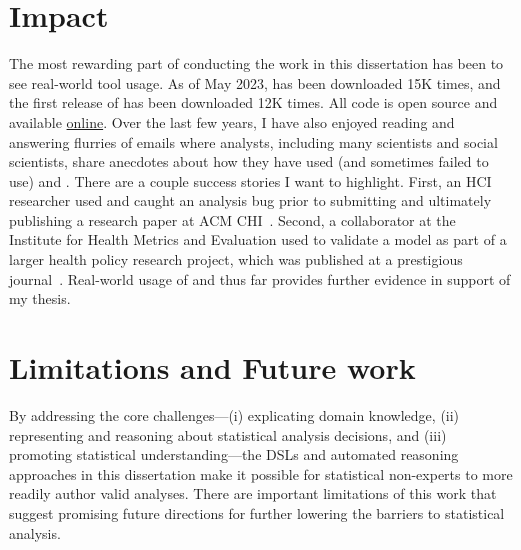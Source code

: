 \section{Impact} \label{sec:impact}
The most rewarding part of conducting the work in this dissertation has been to
see real-world tool usage. As of May 2023, \tea has been downloaded 15K
times, and the first release of \tisane has been downloaded 12K times. All code
is open source and available \href{https://github.com/tea-lang-org}{online}.
Over the last few years, I have also enjoyed reading and answering flurries of
emails where analysts, including many scientists and social scientists, share
anecdotes about how they have used (and sometimes failed to use) \tea and \tisane.
There are a couple success stories I want to highlight. First, an HCI researcher
used \tisane and caught an analysis bug prior to submitting and ultimately
publishing a research paper at ACM CHI~\cite{baughan2022dissociation}. Second, a
collaborator at the Institute for Health Metrics and Evaluation used \tisane to validate a model as part of a larger health
policy research project, which was published at a prestigious
journal~\cite{johnson2022varied}.
Real-world usage of \tea and \tisane thus far provides further evidence in support of my thesis.

\section{Limitations and Future work} \label{sec:futureWork}
By addressing the core challenges---(i) explicating domain knowledge,
(ii) representing and reasoning about statistical analysis decisions, and (iii)
promoting statistical understanding---the DSLs and automated reasoning
approaches in this dissertation make it possible for statistical non-experts to
more readily author valid analyses. There are important limitations of this work
that suggest promising future directions for further lowering the barriers to
statistical analysis. 

